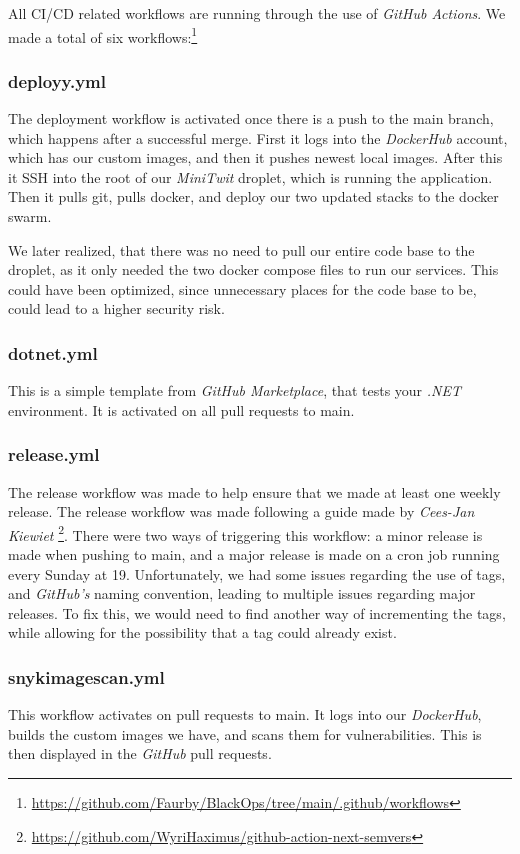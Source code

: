 All CI/CD related workflows are running through the use of \textit{GitHub Actions}. We made a total of six workflows:\footnote{\url{https://github.com/Faurby/BlackOps/tree/main/.github/workflows}}

\subsubsection{deployy.yml}
The deployment workflow is activated once there is a push to the main branch, which happens after a successful merge. First it logs into the \textit{DockerHub} account, which has our custom images, and then it pushes newest local images. After this it SSH into the root of our \textit{MiniTwit} droplet, which is running the application. Then it pulls git, pulls docker, and deploy our two updated stacks to the docker swarm.

We later realized, that there was no need to pull our entire code base to the droplet, as it only needed the two docker compose files to run our services. This could have been optimized, since unnecessary places for the code base to be, could lead to a higher security risk.

\subsubsection{dotnet.yml}
This is a simple template from \textit{GitHub Marketplace}, that tests your \textit{.NET} environment. It is activated on all pull requests to main.

\subsubsection{release.yml}
The release workflow was made to help ensure that we made at least one weekly release. The release workflow was made following a guide made by \textit{Cees-Jan Kiewiet} \footnote{\url{https://github.com/WyriHaximus/github-action-next-semvers}}. There were two ways of triggering this workflow: a minor release is made when pushing to main, and a major release is made on a cron job running every Sunday at 19. Unfortunately, we had some issues regarding the use of tags, and \textit{GitHub's} naming convention, leading to multiple issues regarding major releases. To fix this, we would need to find another way of incrementing the tags, while allowing for the possibility that a tag could already exist.

\subsubsection{snykimagescan.yml}
This workflow activates on pull requests to main. It logs into our \textit{DockerHub}, builds the custom images we have, and scans them for vulnerabilities. This is then displayed in the \textit{GitHub} pull requests.

